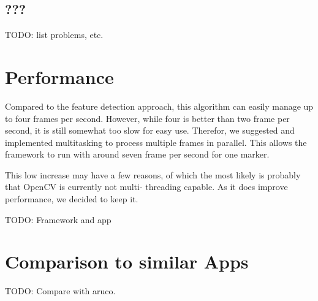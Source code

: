 \subsection{???}

TODO: list problems, etc.

\section{Performance}
\label{performance}

Compared to the feature detection approach, this algorithm can easily manage up to four frames per second.
However, while four is better than two frame per second, it is still somewhat too slow for easy use.
Therefor, we suggested and implemented multitasking to process multiple frames in parallel.
This allows the framework to run with around seven frame per second for one marker.

This low increase may have a few reasons, of which the most likely is probably that OpenCV is currently not multi-
threading capable.
As it does improve performance, we decided to keep it.

TODO: Framework and app

\section{Comparison to similar Apps}

TODO: Compare with aruco.
